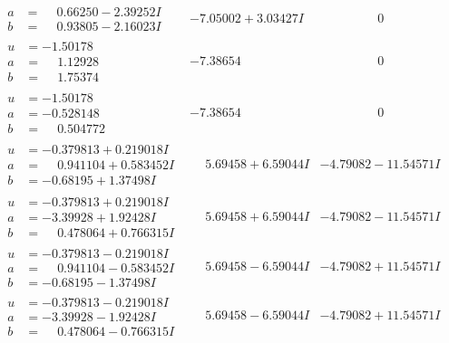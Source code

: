 \documentclass[1p]{elsarticle_modified}
\theoremstyle{definition}
\begin{document}
$$\begin{array}{c|c|c}
\begin{aligned}
a &= \phantom{-}0.66250 - 2.39252 I \\
b &= \phantom{-}0.93805 - 2.16023 I\end{aligned}
 & -7.05002 + 3.03427 I & \phantom{-0.000000 } 0 \\ \hline\begin{aligned}
u &= -1.50178\phantom{ +0.000000I} \\
a &= \phantom{-}1.12928\phantom{ +0.000000I} \\
b &= \phantom{-}1.75374\phantom{ +0.000000I}\end{aligned}
 & -7.38654\phantom{ +0.000000I} & \phantom{-0.000000 } 0 \\ \hline\begin{aligned}
u &= -1.50178\phantom{ +0.000000I} \\
a &= -0.528148\phantom{ +0.000000I} \\
b &= \phantom{-}0.504772\phantom{ +0.000000I}\end{aligned}
 & -7.38654\phantom{ +0.000000I} & \phantom{-0.000000 } 0 \\ \hline\begin{aligned}
u &= -0.379813 + 0.219018 I \\
a &= \phantom{-}0.941104 + 0.583452 I \\
b &= -0.68195 + 1.37498 I\end{aligned}
 & \phantom{-}5.69458 + 6.59044 I & -4.79082 - 11.54571 I \\ \hline\begin{aligned}
u &= -0.379813 + 0.219018 I \\
a &= -3.39928 + 1.92428 I \\
b &= \phantom{-}0.478064 + 0.766315 I\end{aligned}
 & \phantom{-}5.69458 + 6.59044 I & -4.79082 - 11.54571 I \\ \hline\begin{aligned}
u &= -0.379813 - 0.219018 I \\
a &= \phantom{-}0.941104 - 0.583452 I \\
b &= -0.68195 - 1.37498 I\end{aligned}
 & \phantom{-}5.69458 - 6.59044 I & -4.79082 + 11.54571 I \\ \hline\begin{aligned}
u &= -0.379813 - 0.219018 I \\
a &= -3.39928 - 1.92428 I \\
b &= \phantom{-}0.478064 - 0.766315 I\end{aligned}
 & \phantom{-}5.69458 - 6.59044 I & -4.79082 + 11.54571 I\\

\end{array}$$
\end{document}
